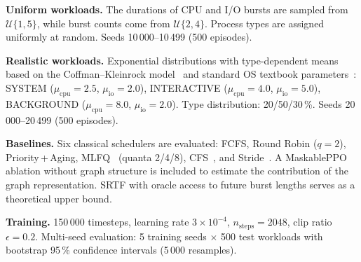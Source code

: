 \documentclass[conference]{IEEEtran}
\begin{document}
\textbf{Uniform workloads.} The durations of CPU and I/O bursts are sampled
from $\mathcal{U}\{1,5\}$, while burst counts come from
$\mathcal{U}\{2,4\}$. Process types are assigned uniformly at random. Seeds
10\,000--10\,499 (500 episodes).

\textbf{Realistic workloads.} Exponential distributions with type-dependent
means based on the Coffman--Kleinrock model~\cite{coffman1968feedback} and
standard OS textbook parameters~\cite{silberschatz2018os}: SYSTEM
($\mu_{\text{cpu}}{=}2.5$, $\mu_{\text{io}}{=}2.0$), INTERACTIVE
($\mu_{\text{cpu}}{=}4.0$, $\mu_{\text{io}}{=}5.0$), BACKGROUND
($\mu_{\text{cpu}}{=}8.0$, $\mu_{\text{io}}{=}2.0$). Type distribution:
20/50/30\,\%. Seeds 20\,000--20\,499 (500 episodes).

\textbf{Baselines.} Six classical schedulers are evaluated: FCFS, Round
Robin ($q{=}2$), Priority\,+\,Aging, MLFQ~\cite{arpaci2023ostep} (quanta
2/4/8), CFS~\cite{molnar2007cfs}, and Stride~\cite{waldspurger1995stride}. A
MaskablePPO ablation without graph structure is included to estimate the
contribution of the graph representation. SRTF with oracle access to future
burst lengths serves as a theoretical upper bound.

\textbf{Training.} 150\,000 timesteps, learning rate $3{\times}10^{-4}$,
$n_{\text{steps}}{=}2048$, clip ratio $\epsilon{=}0.2$. Multi-seed
evaluation: 5 training seeds $\times$ 500 test workloads with bootstrap
95\,\% confidence intervals (5\,000 resamples).
\end{document}
